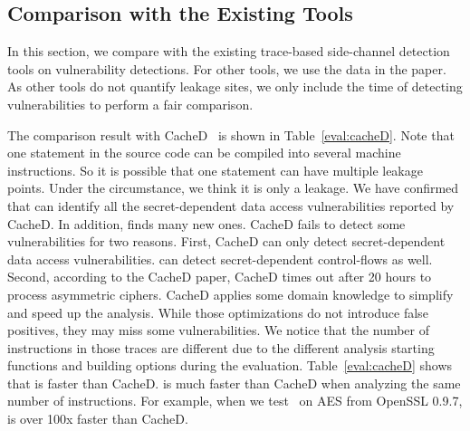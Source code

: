 \subsection{Comparison with the Existing Tools}
\label{eval:scala}

In this section, we compare \tool{} with the
existing trace-based side-channel detection tools on vulnerability detections. For other tools, we use the data in the paper. As other tools do not quantify leakage sites, 
we only include the time of detecting vulnerabilities to perform a fair comparison.

The comparison result with CacheD~\cite{203878} is shown in Table~\ref{eval:cacheD}.
Note that one statement in the source code can be compiled into several machine instructions. So it is possible that one statement can have multiple leakage points. Under the circumstance, we think it is only a leakage.
We have confirmed that \tool{} can identify all the secret-dependent data access vulnerabilities reported by CacheD. In addition, \tool{} finds many new ones. 
CacheD fails to detect some vulnerabilities for two
reasons. First, CacheD can only detect secret-dependent data access
vulnerabilities. \tool{} can detect secret-dependent control-flows as well.
Second, according to the CacheD paper, CacheD times out after 20 hours to process
asymmetric ciphers. CacheD applies some domain knowledge to simplify and speed up
the analysis. 
While those optimizations do not introduce false positives, they may miss some
vulnerabilities. 
We notice that the number of instructions in those traces are different due to the different analysis starting 
functions and building options during the evaluation. 
Table~\ref{eval:cacheD} shows that
\tool{} is faster than CacheD. \tool{} is much faster than CacheD when analyzing the same
number of instructions. For example, when we test~\tool{} on AES from OpenSSL
0.9.7, \tool{} is over 100x faster than CacheD.  

